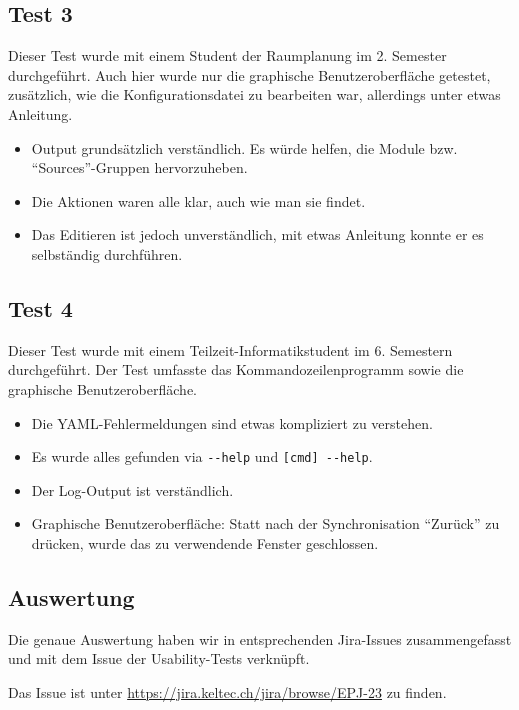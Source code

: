 \documentclass[a4paper]{article}
\begin{document}
  \subsection{Test 3}

  Dieser Test wurde mit einem Student der Raumplanung im 2. Semester durchgeführt. Auch hier wurde nur die graphische Benutzeroberfläche getestet, zusätzlich, wie die Konfigurationsdatei zu bearbeiten war, allerdings unter etwas Anleitung.

  \begin{itemize}
    \item Output grundsätzlich verständlich. Es würde helfen, die Module bzw. ``Sources''-Gruppen hervorzuheben.
    \item Die Aktionen waren alle klar, auch wie man sie findet.
    \item Das Editieren ist jedoch unverständlich, mit etwas Anleitung konnte er es selbständig durchführen.
  \end{itemize}

  \subsection{Test 4}

  Dieser Test wurde mit einem Teilzeit-Informatikstudent im 6. Semestern durchgeführt. Der Test umfasste das Kommandozeilenprogramm  sowie die graphische Benutzeroberfläche.

  \begin{itemize}
    \item Die YAML-Fehlermeldungen sind etwas kompliziert zu verstehen.
    \item Es wurde alles gefunden via \verb|--help| und \verb|[cmd] --help|.
    \item Der Log-Output ist verständlich.
    \item Graphische Benutzeroberfläche: Statt nach der Synchronisation ``Zurück'' zu drücken, wurde das zu verwendende Fenster geschlossen.
  \end{itemize}

  \subsection{Auswertung}

  Die genaue Auswertung haben wir in entsprechenden Jira-Issues zusammengefasst und mit dem Issue der Usability-Tests verknüpft.

  Das Issue ist unter \url{https://jira.keltec.ch/jira/browse/EPJ-23} zu finden.
\end{document}
